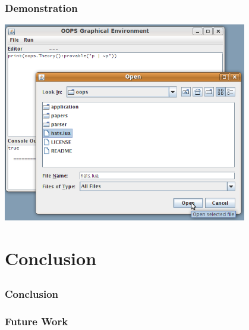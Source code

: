 \documentclass{beamer}
\begin{document}
\begin{frame}
\frametitle{Demonstration}
\includegraphics[width=0.8\textwidth]{demo03}
\end{frame}

\section{Conclusion}
\subsection{}

\begin{frame}
\frametitle{Conclusion}

\end{frame}

\begin{frame}
\frametitle{Future Work}

\end{frame}
\end{document}
